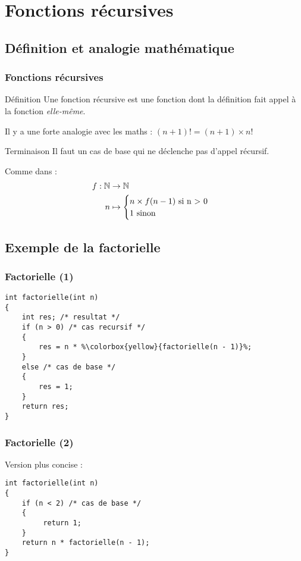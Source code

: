 \documentclass[xcolor=svgnames]{beamer}
\begin{document}
\section[Récursion]{Fonctions récursives}
\subsection{Définition et analogie mathématique}
\begin{frame}
  \frametitle{Fonctions récursives}

  \begin{block}{Définition}
    Une fonction récursive est une fonction dont la définition fait
    appel à la fonction \emph{elle-même}.
  \end{block}

\pause
Il y a une forte analogie avec les maths : $(n + 1)! = (n + 1) \times n!$

\pause
\begin{alertblock}{Terminaison}
  Il faut un cas de base qui ne déclenche pas d'appel récursif.
\end{alertblock}
\pause
Comme
  dans :
\begin{align*}
  f: \mathbb{N} &\to \mathbb{N} \\
  n &\mapsto
  \begin{cases}
    n\times f(n-1) \text{ si  n > 0}\\
    1 \text{ sinon}
  \end{cases}
\end{align*}
\end{frame}

\subsection{Exemple de la factorielle}
\begin{frame}[fragile]
  \frametitle{Factorielle (1)}
\begin{lstlisting}[escapechar={\%},basicstyle=\ttfamily\small] 
int factorielle(int n)
{
    int res; /* resultat */ 
    if (n > 0) /* cas recursif */
    {
        res = n * %\colorbox{yellow}{factorielle(n - 1)}%; 
    } 
    else /* cas de base */ 
    {
        res = 1; 
    }
    return res;
}
\end{lstlisting}
\end{frame}

\begin{frame}[fragile]
  \frametitle{Factorielle (2)}

Version plus concise :
\begin{lstlisting}[escapechar={\%},basicstyle=\ttfamily\small] 
int factorielle(int n)
{
    if (n < 2) /* cas de base */
    {
         return 1;
    } 
    return n * factorielle(n - 1); 
}
\end{lstlisting}
\end{frame}
\end{document}
